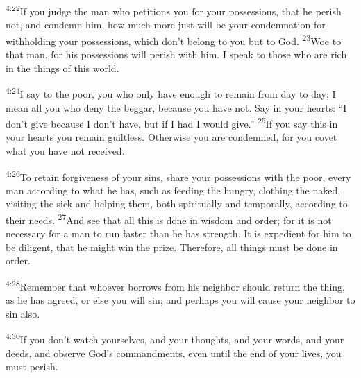 \documentclass[openany,12pt,english]{book}
\newenvironment{para}{\par\pretolerance=100\tolerance=200\setlength{\emergencystretch}{0.6em}\relax}{\par}
\begin{document}
\begin{para}
    \textsuperscript{4:22}\thinspace{}If you judge the man who petitions you for your possessions, that he per\-ish not, and con\-demn him, how much more just will be your con\-dem\-na\-tion for with\-hold\-ing your possessions, which don't be\-long to you but to God.
    \textsuperscript{23}\thinspace{}Woe to that man, for his possessions will per\-ish with him. I speak to those who are rich in the things of this world.
\end{para}

\begin{para}
    \textsuperscript{4:24}\thinspace{}I say to the poor, you who on\-ly have e\-nough to re\-main from day to day; I mean all you who de\-ny the beg\-gar, be\-cause you have not. Say in your hearts: “I don't give be\-cause I don't have, but if I had I would give.”
    \textsuperscript{25}\thinspace{}If you say this in your hearts you re\-main guilt\-less. Oth\-er\-wise you are condemned, for you cov\-et what you have not re\-ceived.
\end{para}

\begin{para}
    \textsuperscript{4:26}\thinspace{}To re\-tain for\-give\-ness of your sins, share your possessions with the poor, eve\-ry man ac\-cord\-ing to what he has, such as feed\-ing the hun\-gry, cloth\-ing the na\-ked, visiting the sick and help\-ing them, both spiritually and tem\-po\-ral\-ly, ac\-cord\-ing to their needs.
    \textsuperscript{27}\thinspace{}And see that all this is done in wis\-dom and or\-der; for it is not nec\-es\-sar\-y for a man to run faster than he has strength. It is ex\-pe\-di\-ent for him to be dil\-i\-gent, that he might win the prize. There\-fore, all things must be done in or\-der.
\end{para}

\begin{para}
    \textsuperscript{4:28}\thinspace{}Re\-mem\-ber that who\-ev\-er borrows from his neigh\-bor should re\-turn the thing, as he has a\-greed, or else you will sin; and per\-haps you will cause your neigh\-bor to sin al\-so.
\end{para}

\begin{para}
    \textsuperscript{4:30}\thinspace{}If you don't watch your\-selves, and your thoughts, and your words, and your deeds, and ob\-serve God's commandments, e\-ven un\-til the end of your lives, you must per\-ish.
\end{para}
\end{document}
